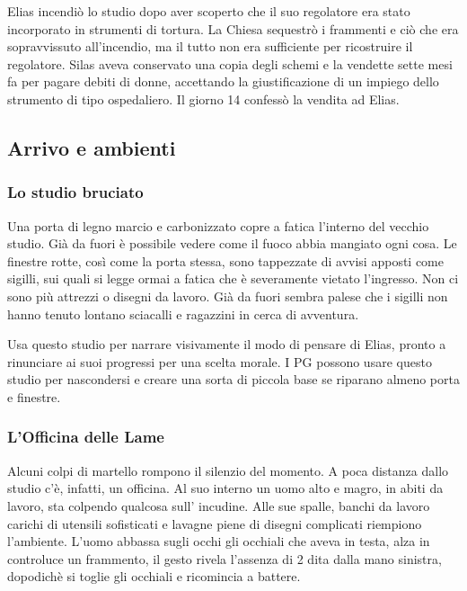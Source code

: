 \documentclass[11pt,a4paper]{article}
\begin{document}
Elias incendiò lo studio dopo aver scoperto che il suo regolatore era stato incorporato in strumenti di tortura. La Chiesa sequestrò i frammenti e ciò che era sopravvissuto all'incendio, ma il tutto non era sufficiente per ricostruire il regolatore. Silas aveva conservato una copia degli schemi e la vendette sette mesi fa per pagare debiti di donne, accettando la giustificazione di un impiego dello strumento di tipo ospedaliero. Il giorno 14 confessò la vendita ad Elias.

\subsection{Arrivo e ambienti}
\subsubsection{Lo studio bruciato}
\begin{readaloud}
Una porta di legno marcio e carbonizzato copre a fatica l'interno del vecchio studio. Già da fuori è possibile vedere come il fuoco abbia mangiato ogni cosa. Le finestre rotte, così come la porta stessa, sono tappezzate di avvisi apposti come sigilli, sui quali si legge ormai a fatica che è severamente vietato l'ingresso. Non ci sono più attrezzi o disegni da lavoro. Già da fuori sembra palese che i sigilli non hanno tenuto lontano sciacalli e ragazzini in cerca di avventura.
\end{readaloud}

\begin{gmbox}
Usa questo studio per narrare visivamente il modo di pensare di Elias, pronto a rinunciare ai suoi progressi per una scelta morale. I PG possono usare questo studio per nascondersi e creare una sorta di piccola base se riparano almeno porta e finestre.
\end{gmbox}


\subsubsection{L'Officina delle Lame}
\begin{readaloud}
Alcuni colpi di martello rompono il silenzio del momento. A poca distanza dallo studio c'è, infatti, un officina. Al suo interno un uomo alto e magro, in abiti da lavoro, sta colpendo qualcosa sull' incudine. Alle sue spalle, banchi da lavoro carichi di utensili sofisticati e lavagne piene di disegni complicati riempiono l'ambiente. L'uomo abbassa sugli occhi gli occhiali che aveva in testa, alza in controluce un frammento, il gesto rivela l'assenza di 2 dita dalla mano sinistra, dopodichè si toglie gli occhiali e ricomincia a battere.
\end{readaloud}
\end{document}
